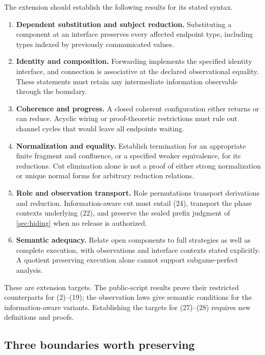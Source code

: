 The extension should establish the following results for its stated syntax.
\begin{enumerate}
\item \textbf{Dependent substitution and subject reduction.} Substituting a
      component at an interface preserves every affected endpoint type,
      including types indexed by previously communicated values.
\item \textbf{Identity and composition.} Forwarding implements the specified
      identity interface, and connection is associative at the declared
      observational equality. These statements must retain any intermediate
      information observable through the boundary.
\item \textbf{Coherence and progress.} A closed coherent configuration either
      returns or can reduce. Acyclic wiring or proof-theoretic restrictions
      must rule out channel cycles that would leave all endpoints waiting.
\item \textbf{Normalization and equality.} Establish termination for an
      appropriate finite fragment and confluence, or a specified weaker
      equivalence, for its reductions. Cut elimination alone is not a proof
      of either strong normalization or unique normal forms for arbitrary
      reduction relations.
\item \textbf{Role and observation transport.} Role permutations transport
      derivations and reduction. Information-aware cut must entail (24),
      transport the phase contexts underlying (22), and preserve the sealed
      prefix judgment of \cref{sec:hiding} when no release is authorized.
\item \textbf{Semantic adequacy.} Relate open components to full strategies
      as well as complete execution, with observations and interface contexts
      stated explicitly. A quotient preserving execution alone cannot support
      subgame-perfect analysis.
\end{enumerate}

These are extension targets. The public-script results prove their restricted
counterparts for (2)--(19); the observation laws give semantic conditions for
the information-aware variants. Establishing the targets for (27)--(28)
requires new definitions and proofs.

\subsection{Three boundaries worth preserving}

